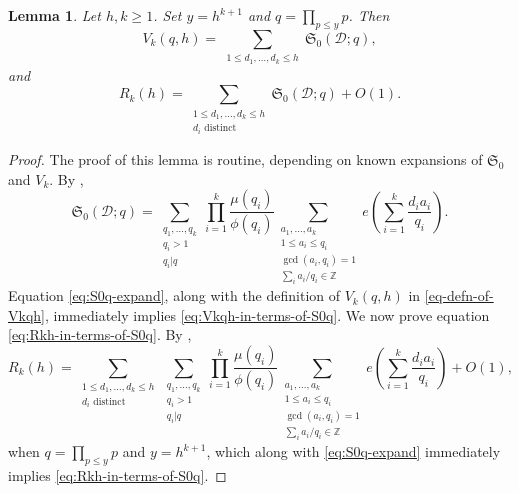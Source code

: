 \documentclass[11pt,letterpaper]{amsart}
\newcommand{\ogcd}[2]{\gcd(#1,#2)}
\newtheorem{lemma}{Lemma}
\theoremstyle{definition}
\begin{document}
\begin{lemma}
Let $h, k \ge 1$. Set $y = h^{k+1}$ and $q = \prod_{p \le y} p$. Then
\begin{equation}\label{eq:Vkqh-in-terms-of-S0q}
V_k(q,h) = \sum_{\substack{1 \le d_1, \ldots, d_k \le h}} \mathfrak S_0(\mathcal D;q),
\end{equation}
and
\begin{equation}\label{eq:Rkh-in-terms-of-S0q}
R_k(h) = \sum_{\substack{1 \le d_1, \ldots, d_k \le h \\ d_i \text{ distinct}}} \mathfrak S_0(\mathcal D;q) + O(1).
\end{equation}
\end{lemma}
\begin{proof}
The proof of this lemma is routine, depending on known expansions of $\mathfrak S_0$ and $V_k$. By \cite[equation (5) and Lemma 2.3]{K21},
\begin{equation}\label{eq:S0q-expand}
\mathfrak S_0(\mathcal D;q) = \sum_{\substack{q_1, \dots, q_k \\ q_i > 1 \\ q_i|q}} \prod_{i=1}^k \frac{\mu(q_i)}{\phi(q_i)} \sum_{\substack{a_1, \dots, a_k \\ 1 \le a_i \le q_i \\ \ogcd{a_i}{q_i} = 1 \\ \sum_i a_i/q_i \in \mathbb Z}} e\left(\sum_{i=1}^k \frac{d_ia_i}{q_i}\right).
\end{equation}
Equation \eqref{eq:S0q-expand}, along with the definition of $V_k(q,h)$ in \eqref{eq-defn-of-Vkqh}, immediately implies \eqref{eq:Vkqh-in-terms-of-S0q}. We now prove equation \eqref{eq:Rkh-in-terms-of-S0q}. By \cite[equations (50) and (51)]{MS04},
\begin{equation*}
R_k(h) = \sum_{\substack{1 \le d_1, \ldots, d_k \le h \\ d_i \text{ distinct}}} \sum_{\substack{q_1, \dots, q_k \\ q_i > 1 \\ q_i|q}} \prod_{i=1}^k \frac{\mu(q_i)}{\phi(q_i)} \sum_{\substack{a_1,\dots, a_k \\ 1 \le a_i \le q_i \\ \ogcd{a_i}{q_i} = 1 \\ \sum_i a_i/q_i \in \mathbb Z}}e\left(\sum_{i=1}^k \frac{d_ia_i}{q_i} \right) + O(1),
\end{equation*}
when $q = \prod_{p \le y} p$ and $y = h^{k+1}$, which along with \eqref{eq:S0q-expand} immediately implies \eqref{eq:Rkh-in-terms-of-S0q}. 
\end{proof}
\end{document}
